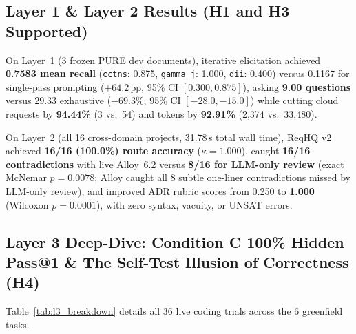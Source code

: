 \documentclass[11pt,a4paper]{article}
\begin{document}


\subsection{Layer 1 \& Layer 2 Results (H1 and H3 Supported)}
On Layer~1 (3 frozen PURE dev documents), iterative elicitation achieved \textbf{0.7583 mean recall} (\texttt{cctns}: 0.875, \texttt{gamma\_j}: 1.000, \texttt{dii}: 0.400) versus 0.1167 for single-pass prompting ($+64.2$\,pp, 95\% CI $[0.300, 0.875]$), asking \textbf{9.00 questions} versus 29.33 exhaustive ($-69.3\%$, 95\% CI $[-28.0, -15.0]$) while cutting cloud requests by \textbf{94.44\%} (3 vs.\ 54) and tokens by \textbf{92.91\%} (2{,}374 vs.\ 33{,}480).

On Layer~2 (all 16 cross-domain projects, 31.78\,s total wall time), ReqHQ v2 achieved \textbf{16/16 (100.0\%) route accuracy} ($\kappa = 1.000$), caught \textbf{16/16 contradictions} with live Alloy~6.2 versus \textbf{8/16 for LLM-only review} (exact McNemar $p = 0.0078$; Alloy caught all 8 subtle one-liner contradictions missed by LLM-only review), and improved ADR rubric scores from 0.250 to \textbf{1.000} (Wilcoxon $p = 0.0001$), with zero syntax, vacuity, or UNSAT errors.

\subsection{Layer 3 Deep-Dive: Condition C 100\% Hidden Pass@1 \& The Self-Test Illusion of Correctness (H4)}
Table~\ref{tab:l3_breakdown} details all 36 live coding trials across the 6 greenfield tasks.
\end{document}
